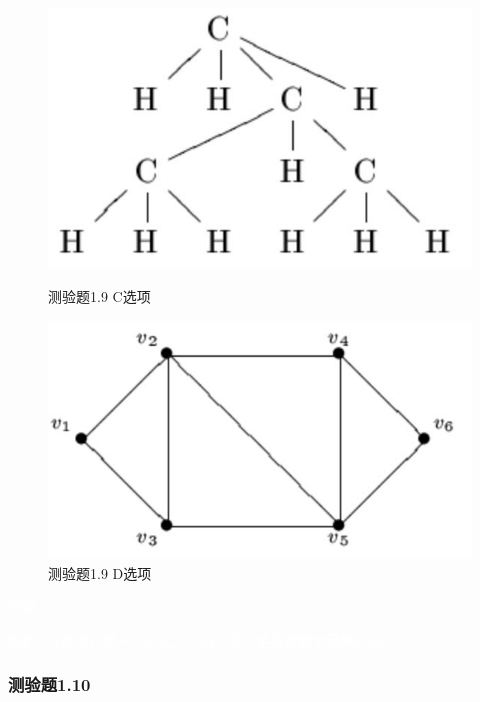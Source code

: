 \documentclass[UTF8, heading=true]{ctexart}
\begin{document}
\begin{figure}[H]
  \centering
  \begin{minipage}[t]{0.35\textwidth}
      \centering
      \includegraphics[width=1\textwidth]{1.9_3.jpg} %
      \caption{测验题1.9 C选项}
  \end{minipage}
  \hfill
  \begin{minipage}[t]{0.35\textwidth}
      \centering
      \includegraphics[width=1\textwidth]{1.9_4.jpg} %
      \caption{测验题1.9 D选项}
\end{minipage}
\end{figure}

\textcolor{white}{答案：A}

\textcolor{white}{解析：A选项只是一个形式上的图，并不是离散数学范畴的图。}

\subsubsection{测验题1.10}
\end{document}

